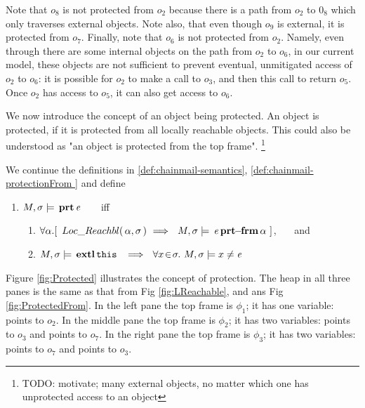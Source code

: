  

Note that $o_8$ is not protected from $o_2$ because there is a path from $o_2$ to $0_8$ which only traverses external objects. Note also, that even though $o_9$ is external, it is protected from $o_7$.
Finally, note that $o_6$ is not protected from $o_2$. 
Namely, even through there are some internal objects on the path from $o_2$ to $o_6$, in our current model, these objects are not sufficient to prevent eventual, unmitigated access of $o_2$ to $o_6$: it is possible for $o_2$ to make a call to $o_3$, and then this call to return $o_5$. Once $o_2$ has access to $o_5$, it can also get access to $o_6$. 


\vspace{.1in}

We now introduce the concept of an object being protected.
An object is protected, if it is protected from all locally reachable objects. This could also be understood as 
"an object is protected from the top frame". \footnote{TODO: motivate; many external objects, no matter which one has unprotected access to an object }
 
\begin{definition} 
\label{def:chainmail-protection}
\label{sect:semantics:assert:prt}
We continue the definitions in \ref{def:chainmail-semantics}, \ref{def:chainmail-protectionFrom } and  define   
\begin{enumerate}
\item
$M , \sigma \models {\ensuremath{\, \mathbf{prt}}\, \mathit{e}\, }$  \ \ \ iff \ \ \ 
\begin{enumerate}
\item
{$\forall \alpha.[ \  \LRelevant {\alpha}  {\sigma}\ \Longrightarrow \ \  \satisfiesA{M}{\sigma}{\protectedFrom{\re} {{\alpha}}}\ ] $}, \ \ \ and 
\item
$\satisfiesA{M}{\sigma}{\external{\prg{this}}}\ \ \Longrightarrow\ \ \forall x\!\in\! \sigma.\ \satisfiesA{M}{\sigma}{x\neq \re}$
\end{enumerate}
\end{enumerate}
\end{definition} 
 
  Figure \ref{fig:Protected} illustrates the concept of protection. The heap in all three panes is the same as that from  Fig \ref{fig:LReachable}, and 
 ans Fig \ref{fig:ProtectedFrom}. In the left pane the top frame is $\phi_1$; it has  one variable:  points to $o_2$. In the middle pane the top frame is $\phi_2$; it has two  variables:   \prg{this} points to $o_3$ and  points to $o_7$. In the right pane  the top frame is $\phi_3$; it has two  variables:    points to $o_7$ and  points to $o_3$.  

